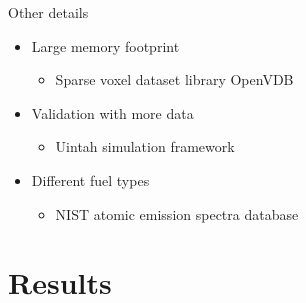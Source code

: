 \documentclass{beamer}
\begin{document}
\begin{frame}{Other details}

\begin{itemize}
\setlength\itemsep{0.5em}
\item Large memory footprint
	\begin{itemize}
	\setlength\itemsep{0.5em}
	\item Sparse voxel dataset library OpenVDB
	\end{itemize}
\item Validation with more data
	\begin{itemize}
	\setlength\itemsep{0.5em}
	\item Uintah simulation framework
	\end{itemize}
\item Different fuel types
	\begin{itemize}
	\setlength\itemsep{0.5em}
	\item NIST atomic emission spectra database
	\end{itemize}
\end{itemize}

\end{frame}

\section{Results}
\subsection{ }
\end{document}
